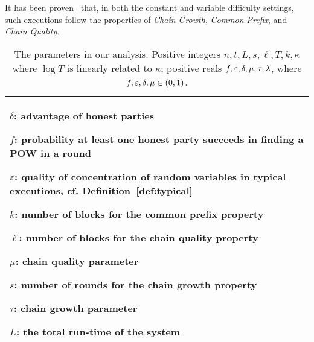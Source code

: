 %
%
It has been proven~\cite{EC:GarKiaLeo15,C:GarKiaLeo17} that, in both the
constant and variable difficulty settings, such executions
follow the properties of \emph{Chain Growth}, \emph{Common Prefix}, and
\emph{Chain Quality}.


\begin{table}
\begin{center}
\begin{tabular}{|p{\columnwidth}|}
\hline
$\delta$: advantage of honest parties%

$f$: probability at least one honest party succeeds in finding a POW in a round

$\varepsilon$: quality of concentration of random variables in typical executions,
cf. Definition~\ref{def:typical}

$k$: number of blocks for the common prefix property

$\ell$: number of blocks for the chain quality property

$\mu$: chain quality parameter

$s$:  number of rounds for the chain growth property

$\tau$: chain growth parameter

$L$: the total run-time of the system \\

\hline
\end{tabular}
\end{center}
\caption{\label{tab:requirements}
The parameters in our analysis. Positive integers $n,t,L,s,\ell,T,k,\kappa$ where $\log T$ is linearly related to $\kappa$; positive reals
$f,\varepsilon,\delta,\mu,\tau,\lambda$, where $f,\varepsilon,\delta,\mu\in(0,1)$.}
\end{table}%

